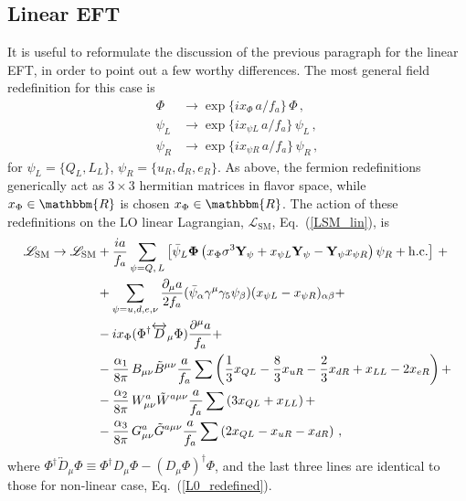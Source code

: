 \documentclass[11pt]{article}
\renewcommand{\a}{\alpha}
\renewcommand{\b}{\beta}
\newcommand{\g}{\gamma}
\newcommand{\BBd}{B_{\mu\nu}}
\newcommand{\WWd}{W_{\mu\nu}}
\renewcommand{\to}{\rightarrow}
\newcommand{\de}{\partial}
\newcommand{\hc}{\mathrm{h.c.}}
\renewcommand{\[}{\begin{equation}}
\renewcommand{\]}{\end{equation}}
\newcommand{\LL}{\mathscr{L}}
\begin{document}
\begin{appendices}
\subsection{Linear EFT}
It is useful to reformulate the discussion of the previous paragraph for the linear EFT, in order to point out a few worthy differences. The most general field redefinition for this case is  
\begin{subequations}\label{general.redef.linear}
\begin{align}
\Phi &\to \exp\{i x_\Phi\, a/f_a\}\,\Phi\,,\\
\psi_L &\to \exp\{i x_{\psi L}\, a/f_a\}\, \psi_L\,,\\
\psi_R &\to \exp\{i x_{\psi R}\, a/f_a\}\, \psi_R\,,
\end{align}
\end{subequations}
for $\psi_L=\{Q_L,L_L\}$, $\psi_R=\{u_R,d_R,e_R\}$. As above, the fermion redefinitions generically act as $3\times3$ hermitian matrices in flavor space, while $x_\Phi\in\mathbbm{R}$ is chosen $x_\Phi\in\mathbbm{R}$. The action of these redefinitions on the LO linear Lagrangian, $\LL_{\text{SM}}$, Eq.~(\ref{LSM_lin}), is 
\begin{equation}\label{LSM_transformed}
\begin{split}
\LL_{\text{SM}}\to \LL_{\text{SM}}&
+\frac{ia}{f_a}\sum_{\psi= Q,\,L}\left[\bar{\psi}_{L}{\bf\Phi} \left(x_\Phi \sigma^3 {\bf Y}_\psi+x_{\psi L}{\bf Y}_\psi-{\bf Y}_\psi x_{\psi R}\right) \psi_{R}+\hc\right]\,+\\
&+\sum_{\psi=u,d,e,\nu}\frac{\de_\mu a}{2f_a}(\bar{\psi}_{\a}\g^\mu\g_5\psi_{\b})(x_{\psi L}-x_{\psi R})_{\a\b}+\\
&-ix_\Phi (\Phi^\dag\overleftrightarrow{D}_\mu\Phi)\frac{\de^\mu a}{f_a}+\\
&-\dfrac{\alpha_1}{8\pi}\,\BBd\tilde{B}^{\mu\nu}\frac{a}{f_a}\sum\left(\frac{1}{3}x_{QL}-\frac{8}{3}x_{uR}-\frac{2}{3}x_{dR}+x_{LL}-2x_{eR}\right)+\\
&-\dfrac{\alpha_2}{8\pi}\, \WWd^a\tilde{W}^{a\mu\nu}\frac{a}{f_a}\sum\left(3x_{QL}+x_{LL}\right)+\\
&-\dfrac{\alpha_3}{8\pi}\, G^a_{\mu\nu}\tilde{G}^{a\mu\nu}\frac{a}{f_a}\sum \left(2x_{QL}-x_{uR}-x_{dR}\right)\,,
\end{split}
\end{equation}
where $\Phi^\dag\overleftrightarrow{D}_\mu\Phi\equiv \Phi^\dag D_\mu\Phi-(D_\mu\Phi)^\dag \Phi$, and the last three lines are identical to those for non-linear case, Eq.~(\ref{L0_redefined}).


\end{appendices}
\end{document}
